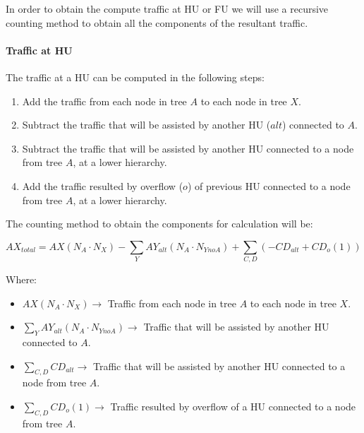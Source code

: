 \documentclass[
	12pt,
	twoside
]{book}
\begin{document}

In order to obtain the compute traffic at HU or FU we will use a recursive counting method to obtain all the components of the resultant traffic.

\paragraph{Traffic at HU}

The traffic at a HU can be computed in the following steps:
\begin{enumerate}
	\item Add the traffic from each node in tree $A$ to each node in tree $X$.
	\item Subtract the traffic that will be assisted by another HU ($alt$) connected to $A$.
	\item Subtract the traffic that will be assisted by another HU connected to a node from tree $A$, at a lower hierarchy.
	\item Add the traffic resulted by overflow ($o$) of previous HU connected to a node from tree $A$, at a lower hierarchy.
\end{enumerate}

The counting method to obtain the components for calculation will be:

$$
	AX_{total} = AX (N_A \cdot N_X) - \sum_Y AY_{alt} (N_A \cdot N_{YnoA}) + \sum_{C, D} \left( - CD_{alt} + CD_o (1) \right)
$$

Where:

\begin{itemize}
	\item $AX (N_A \cdot N_X) \rightarrow$ Traffic from each node in tree $A$ to each node in tree $X$.
	\item $\sum_Y AY_{alt} (N_A \cdot N_{YnoA}) \rightarrow$ Traffic that will be assisted by another HU connected to $A$.
	\item $\sum_{C, D} CD_{alt} \rightarrow$ Traffic that will be assisted by another HU connected to a node from tree $A$.
	\item $\sum_{C, D} CD_o (1) \rightarrow$ Traffic resulted by overflow of a HU connected to a node from tree $A$.
\end{itemize}

\end{document}
